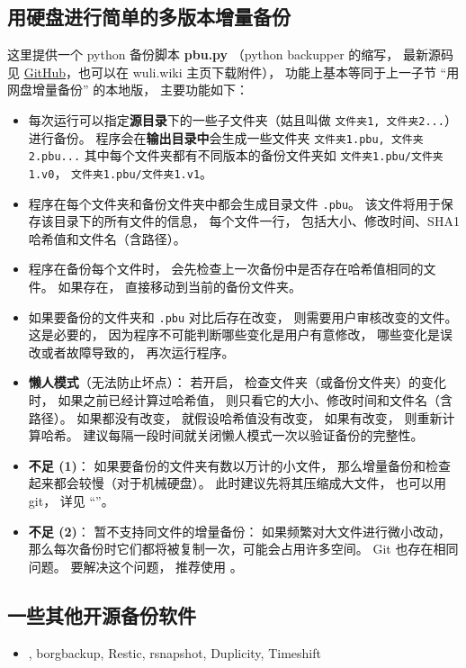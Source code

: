 \subsection{用硬盘进行简单的多版本增量备份}
这里提供一个 python 备份脚本 \textbf{pbu.py} （python backupper 的缩写， 最新源码见 \href{https://github.com/MacroUniverse/pbu}{GitHub}，也可以在 wuli.wiki 主页下载附件）， 功能上基本等同于上一子节 “用网盘增量备份” 的本地版， 主要功能如下：
\begin{itemize}
\item 每次运行可以指定\textbf{源目录}下的一些子文件夹（姑且叫做 \verb|文件夹1, 文件夹2...|）进行备份。 程序会在\textbf{输出目录中}会生成一些文件夹 \verb|文件夹1.pbu, 文件夹2.pbu...| 其中每个文件夹都有不同版本的备份文件夹如 \verb|文件夹1.pbu/文件夹1.v0|， \verb|文件夹1.pbu/文件夹1.v1|。
\item 程序在每个文件夹和备份文件夹中都会生成目录文件 \verb|.pbu|。 该文件将用于保存该目录下的所有文件的信息， 每个文件一行， 包括大小、修改时间、SHA1 哈希值和文件名（含路径）。
\item 程序在备份每个文件时， 会先检查上一次备份中是否存在哈希值相同的文件。 如果存在， 直接移动到当前的备份文件夹。
\item 如果要备份的文件夹和 \verb|.pbu| 对比后存在改变， 则需要用户审核改变的文件。 这是必要的， 因为程序不可能判断哪些变化是用户有意修改， 哪些变化是误改或者故障导致的， 再次运行程序。
\item \textbf{懒人模式}（无法防止坏点）： 若开启， 检查文件夹（或备份文件夹）的变化时， 如果之前已经计算过哈希值， 则只看它的大小、修改时间和文件名（含路径）。 如果都没有改变， 就假设哈希值没有改变， 如果有改变， 则重新计算哈希。 建议每隔一段时间就关闭懒人模式一次以验证备份的完整性。
\item \textbf{不足 (1)}： 如果要备份的文件夹有数以万计的小文件， 那么增量备份和检查起来都会较慢（对于机械硬盘）。 此时建议先将其压缩成大文件， 也可以用 git， 详见 “”。
\item \textbf{不足 (2)}： 暂不支持同文件的增量备份： 如果频繁对大文件进行微小改动， 那么每次备份时它们都将被复制一次，可能会占用许多空间。 Git 也存在相同问题。 要解决这个问题， 推荐使用 。
\end{itemize}

\subsection{一些其他开源备份软件}
\begin{itemize}
\item {}, borgbackup, Restic, rsnapshot, Duplicity, Timeshift
\end{itemize}
